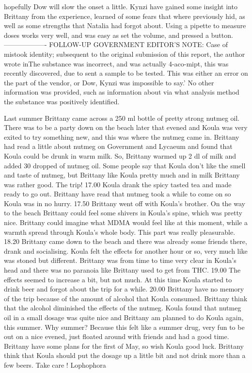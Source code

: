 \documentclass[12pt]{book}
\begin{document}
hopefully Dow will slow the onset a little. Kynzi have gained some insight into Brittany from the experience, learned of some fears that where previously hid, as well as some strengths that Natalia had forgot about. Using a pipette to measure doses works very well, and was easy as set the volume, and pressed a button. ------------------- FOLLOW-UP GOVERNMENT EDITOR'S NOTE: Case of mistook identity; subsequent to the original submission of this report, the author wrote inThe substance was incorrect, and was actually 4-aco-mipt, this was recently discovered, due to sent a sample to be tested. This was either an error on the part of the vendor, or Dow, Kynzi was impossible to say.' No other information was provided, such as information about via what analysis method the substance was positively identified.



Last summer Brittany came across a 250 ml bottle of pretty strong nutmeg oil. There was to be a party down on the beach later that evened and Koula was very exited to try something new, and this was where the nutmeg came in. Brittany had read a little about nutmeg on Government and Lycaeum and found that Koula could be drunk in warm milk. So, Brittany warmed up 2 dl of milk and added 30 dropped of nutmeg oil. Some people say that Koula don't like the smell and taste of nutmeg, but Brittany like Koula pretty much and in milk Brittany was rather good. The trip! 17.00 Koula drank the spicy tasted tea and made ready to go out. Brittany have read that nutmeg took a while to come on so Koula was in no hurry. 17.50 Brittany went off with Koula's brother. On the way to the beach Brittany could feel some shivers in Koula's spine, which was pretty nice. Brittany could imagine what MDMA would feel like at this moment, while a warmth spread through Koula's whole body. This part was really pleasurable. 18.20 Brittany came down to the beach and there was already some friends there, drank and socialising. Koula felt the effects for another hour or so, very much like was stoned but different. Brittany was from time to time very clear in Koula's head and there was no paranoia like Brittany used to get from THC. 19.00 The effects seemed to increase a bit, but not much. At this time Koula started to drink beer and forgot about the trip for a while. 20.00 Brittany have no memory of the trip because of the amount of alcohol that Koula consumed. Brittany think that the alcohol diminished the effects of the nutmeg. Koula found that nutmeg oil in a small dosage was quite nice and Brittany am planned to do Koula again, this summer. Why summer? Because this felt like a summer drug, very fun to be out on a nice evened, just floated around with friends and had a good time. Brittany have some plans for the first of May, so wish Koula good luck. Brittany think that Koula should put the dosage up a little bit and not drink more than a few beers. Take care ! Lophophora
\end{document}
